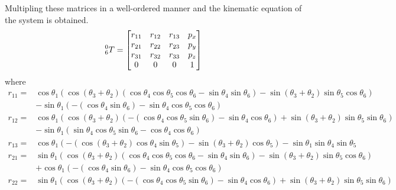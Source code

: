 \documentclass{article}
\begin{document}
Multipling these matrices in a well-ordered manner and the kinematic equation of the system is obtained.
\[
    \prescript{0}{6}{T} = \begin{bmatrix}
        r_{11} & r_{12} & r_{13} & p_x \\
        r_{21} & r_{22} & r_{23} & p_y \\
        r_{31} & r_{32} & r_{33} & p_z \\
        0 & 0 & 0 & 1
    \end{bmatrix}
\]
where
\[
    \begin{aligned}
        r_{11} = & \cos\theta_1 \left( \cos{\left( {{\theta }_3}+{{\theta }_2}\right) } \left( \cos\theta_4 \cos\theta_5 \cos\theta_6-\sin\theta_4 \sin\theta_6\right) - \sin{\left( {{\theta }_3}+{{\theta }_2}\right) } \sin\theta_5 \cos\theta_6\right) \\
        &-\sin\theta_1 \left( -\left( \cos\theta_4 \sin\theta_6\right) -\sin\theta_4 \cos\theta_5 \cos\theta_6\right)   \\
        r_{12} = & \cos\theta_1 \left( \cos{\left( {{\theta }_3}+{{\theta }_2}\right) } \left( -\left( \cos\theta_4 \cos\theta_5 \sin\theta_6\right) -\sin\theta_4 \cos\theta_6\right) +\sin{\left( {{\theta }_3}+{{\theta }_2}\right) } \sin\theta_5 \sin\theta_6\right) \\
        &-\sin\theta_1 \left( \sin\theta_4 \cos\theta_5 \sin\theta_6-\cos\theta_4 \cos\theta_6\right) \\
        r_{13} = & \cos\theta_1 \left( -\left( \cos{\left( {{\theta }_3}+{{\theta }_2}\right) } \cos\theta_4 \sin\theta_5\right) -\sin{\left( {{\theta }_3}+{{\theta }_2}\right) } \cos\theta_5\right) -\sin\theta_1 \sin\theta_4 \sin\theta_5 \\
        r_{21} = & \sin\theta_1 \left( \cos{\left( {{\theta }_3}+{{\theta }_2}\right) } \left( \cos\theta_4 \cos\theta_5 \cos\theta_6-\sin\theta_4 \sin\theta_6\right) -\sin{\left( {{\theta }_3}+{{\theta }_2}\right) } \sin\theta_5 \cos\theta_6\right) \\
        &+\cos\theta_1 \left( -\left( \cos\theta_4 \sin\theta_6\right) -\sin\theta_4 \cos\theta_5 \cos\theta_6\right) \\
        r_{22} = & \sin\theta_1 \left( \cos{\left( {{\theta }_3}+{{\theta }_2}\right) } \left( -\left( \cos\theta_4 \cos\theta_5 \sin\theta_6\right) -\sin\theta_4 \cos\theta_6\right) +\sin{\left( {{\theta }_3}+{{\theta }_2}\right) } \sin\theta_5 \sin\theta_6\right) \\

\end{aligned}\]
\end{document}
